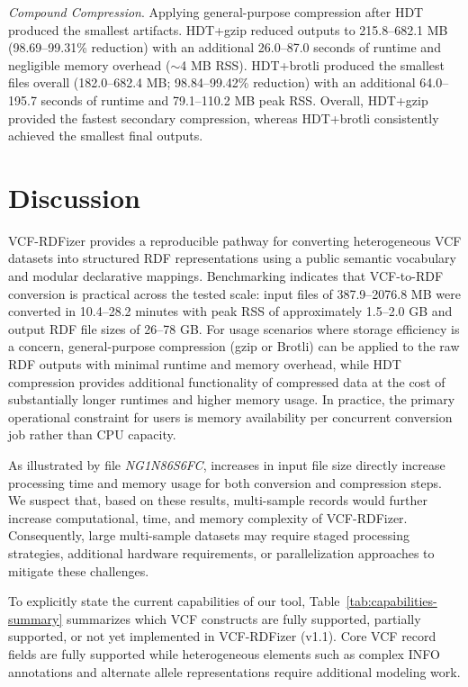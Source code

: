 \documentclass[unnumsec,webpdf,contemporary,large]{oup-authoring-template}
\begin{document}
\textit{Compound Compression}.
Applying general-purpose compression after HDT produced the smallest artifacts.
HDT+gzip reduced outputs to 215.8--682.1 MB (98.69--99.31\% reduction) with an additional 26.0--87.0 seconds of runtime and negligible memory overhead ($\sim$4 MB RSS).
HDT+brotli produced the smallest files overall (182.0--682.4 MB; 98.84--99.42\% reduction) with an additional 64.0--195.7 seconds of runtime and 79.1--110.2 MB peak RSS.
Overall, HDT+gzip provided the fastest secondary compression, whereas HDT+brotli consistently achieved the smallest final outputs.

\section{Discussion}\label{sec4}
VCF-RDFizer provides a reproducible pathway for converting heterogeneous VCF datasets into structured RDF representations using a public semantic vocabulary and modular declarative mappings. 
Benchmarking indicates that VCF-to-RDF conversion is practical across the tested scale: input files of 387.9--2076.8 MB were converted in 10.4--28.2 minutes with peak RSS of approximately 1.5--2.0 GB and output RDF file sizes of 26--78 GB. 
For usage scenarios where storage efficiency is a concern, general-purpose compression (gzip or Brotli) can be applied to the raw RDF outputs with minimal runtime and memory overhead, while HDT compression provides additional functionality of compressed data at the cost of substantially longer runtimes and higher memory usage.
In practice, the primary operational constraint for users is memory availability per concurrent conversion job rather than CPU capacity.

As illustrated by file \textit{NG1N86S6FC}, increases in input file size directly increase processing time and memory usage for both conversion and compression steps. 
We suspect that, based on these results, multi-sample records would further increase computational, time, and memory complexity of VCF-RDFizer. 
Consequently, large multi-sample datasets may require staged processing strategies, additional hardware requirements, or parallelization approaches to mitigate these challenges.

To explicitly state the current capabilities of our tool, Table~\ref{tab:capabilities-summary} summarizes which VCF constructs are fully supported, partially supported, or not yet implemented in VCF-RDFizer (v1.1). 
Core VCF record fields are fully supported while heterogeneous elements such as complex INFO annotations and alternate allele representations require additional modeling work.
\end{document}

